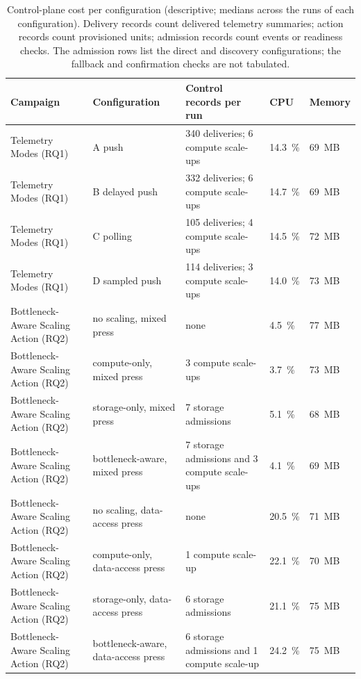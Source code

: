 ﻿\documentclass[12pt,reqno,twoside]{amsbook}
\begin{document}
{\begin{table}[H]
    \centering
    \caption{Control-plane cost per configuration (descriptive; medians
    across the runs of each configuration). Delivery records count delivered
    telemetry summaries; action records count provisioned units; admission
    records count events or readiness checks. The admission rows list the
    direct and discovery configurations; the fallback and confirmation checks
    are not tabulated.}
    \label{tab:app_config_control_cost}
    \footnotesize
    \setlength{\tabcolsep}{3pt}
    \begin{tabular}{p{} p{} p{} p{} p{}}
        \toprule
        Campaign & Configuration & Control records per run & CPU & Memory \\
        \midrule
        Telemetry Modes (RQ1) & A push & 340 deliveries; 6 compute scale-ups & 14.3~\% & 69~MB \\
        Telemetry Modes (RQ1) & B delayed push & 332 deliveries; 6 compute scale-ups & 14.7~\% & 69~MB \\
        Telemetry Modes (RQ1) & C polling & 105 deliveries; 4 compute scale-ups & 14.5~\% & 72~MB \\
        Telemetry Modes (RQ1) & D sampled push & 114 deliveries; 3 compute scale-ups & 14.0~\% & 73~MB \\
        Bottleneck-Aware Scaling Action (RQ2) & no scaling, mixed press & none & 4.5~\% & 77~MB \\
        Bottleneck-Aware Scaling Action (RQ2) & compute-only, mixed press & 3 compute scale-ups & 3.7~\% & 73~MB \\
        Bottleneck-Aware Scaling Action (RQ2) & storage-only, mixed press & 7 storage admissions & 5.1~\% & 68~MB \\
        Bottleneck-Aware Scaling Action (RQ2) & bottleneck-aware, mixed press & 7 storage admissions and 3 compute scale-ups & 4.1~\% & 69~MB \\
        Bottleneck-Aware Scaling Action (RQ2) & no scaling, data-access press & none & 20.5~\% & 71~MB \\
        Bottleneck-Aware Scaling Action (RQ2) & compute-only, data-access press & 1 compute scale-up & 22.1~\% & 70~MB \\
        Bottleneck-Aware Scaling Action (RQ2) & storage-only, data-access press & 6 storage admissions & 21.1~\% & 75~MB \\
        Bottleneck-Aware Scaling Action (RQ2) & bottleneck-aware, data-access press & 6 storage admissions and 1 compute scale-up & 24.2~\% & 75~MB \\

\end{tabular}
\end{table}}
\end{document}
